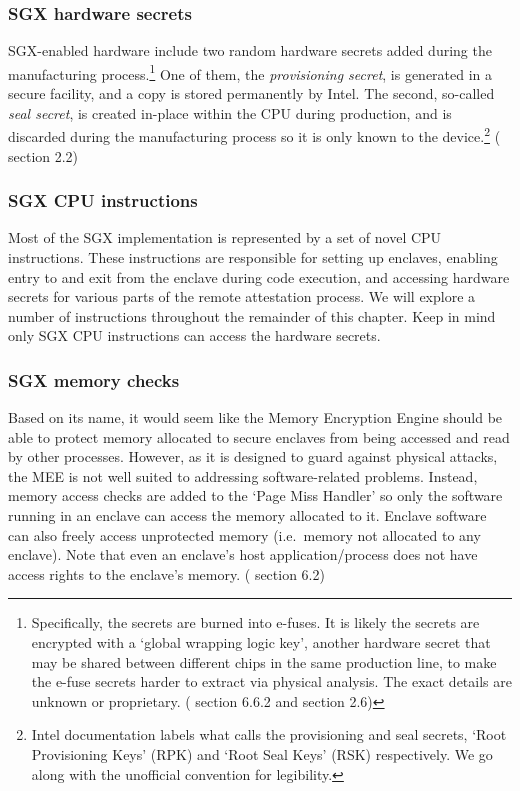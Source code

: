 \subsubsection{SGX hardware secrets}

SGX-enabled hardware include two random hardware secrets added during the manufacturing process.\footnote{Specifically, the secrets are burned into e-fuses. It is likely the secrets are encrypted with a `global wrapping logic key', another hardware secret that may be shared between different chips in the same production line, to make the e-fuse secrets harder to extract via physical analysis. The exact details are unknown or proprietary. (\cite{intel-sgx-explained-advanced} section 6.6.2 and \cite{sgx-security-analysis-mit-sanctum-architecture} section 2.6)} One of them, the {\em provisioning secret}, is generated in a secure facility, and a copy is stored permanently by Intel. The second, so-called {\em seal secret}, is created in-place within the CPU during production, and is discarded during the manufacturing process so it is only known to the device.\footnote{Intel documentation \cite{sgx-epid-provisioning-attestation} labels what \cite{intel-sgx-explained-advanced} calls the provisioning and seal secrets, `Root Provisioning Keys' (RPK) and `Root Seal Keys' (RSK) respectively. We go along with the unofficial convention for legibility.} (\cite{sgx-epid-provisioning-attestation} section 2.2)

\subsubsection{SGX CPU instructions}

Most of the SGX implementation is represented by a set of novel CPU instructions. These instructions are responsible for setting up enclaves, enabling entry to and exit from the enclave during code execution, and accessing hardware secrets for various parts of the remote attestation process. We will explore a number of instructions throughout the remainder of this chapter. Keep in mind only SGX CPU instructions can access the hardware secrets.

\subsubsection{SGX memory checks}

Based on its name, it would seem like the Memory Encryption Engine should be able to protect memory allocated to secure enclaves from being accessed and read by other processes. However, as it is designed to guard against physical attacks, the MEE is not well suited to addressing software-related problems. Instead, memory access checks are added to the `Page Miss Handler' so only the software running in an enclave can access the memory allocated to it. Enclave software can also freely access unprotected memory (i.e.\ memory not allocated to any enclave). Note that even an enclave's host application/process does not have access rights to the enclave's memory. (\cite{intel-sgx-explained-advanced} section 6.2)

